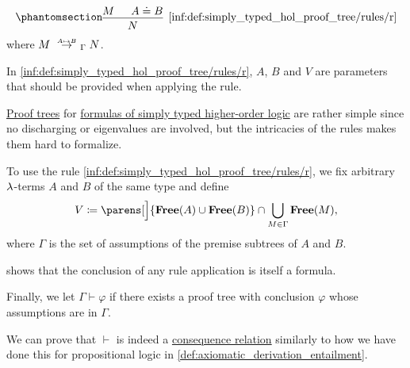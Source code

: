 \begin{definition}
\begin{thmenum}[series=def:simply_typed_hol_proof_tree]
\begin{paracol}{3}
      \begin{nthcolumn}{2}
        \ParacolAlignmentHack
        \begin{equation*}\taglabel[\ensuremath{ \logic{R} }]{inf:def:simply_typed_hol_proof_tree/rules/r}
          \begin{prooftree}
            \hypo{ M }
            \hypo{ A \syneq B }
            \infer2[\ref{inf:def:simply_typed_hol_proof_tree/rules/r}]{ N },
          \end{prooftree}
        \end{equation*}
        where \( M \redrel{A \mapsto B}_\Gamma N \).
      \end{nthcolumn}
    \end{paracol}

    In \ref{inf:def:simply_typed_hol_proof_tree/rules/r}, \( A \), \( B \) and \( V \) are parameters that should be provided when applying the rule.

     \hyperref[con:proof_tree]{Proof trees} for \hyperref[def:simply_typed_hol_formula]{formulas of simply typed higher-order logic} are rather simple since no discharging or eigenvalues are involved, but the intricacies of the rules makes them hard to formalize.

    To use the rule \ref{inf:def:simply_typed_hol_proof_tree/rules/r}, we fix arbitrary \( {\mathrm \lambda} \)-terms \( A \) and \( B \) of the same type and define
    \begin{equation*}
      V \coloneqq \parens[\Big]{ \op*{Free}(A) \cup \op*{Free}(B) } \cap \bigcup_{M \in \Gamma} \op*{Free}(M),
    \end{equation*}
    where \( \Gamma \) is the set of assumptions of the premise subtrees of \( A \) and \( B \).

     shows that the conclusion of any rule application is itself a formula.

     Finally, we let \( \Gamma \vdash \varphi \) if there exists a proof tree with conclusion \( \varphi \) whose assumptions are in \( \Gamma \).
  \end{thmenum}
\end{definition}
\begin{defproof}
  We can prove that \( {\vdash} \) is indeed a \hyperref[def:consequence_relation]{consequence relation} similarly to how we have done this for propositional logic in \cref{def:axiomatic_derivation_entailment}.
\end{defproof}
